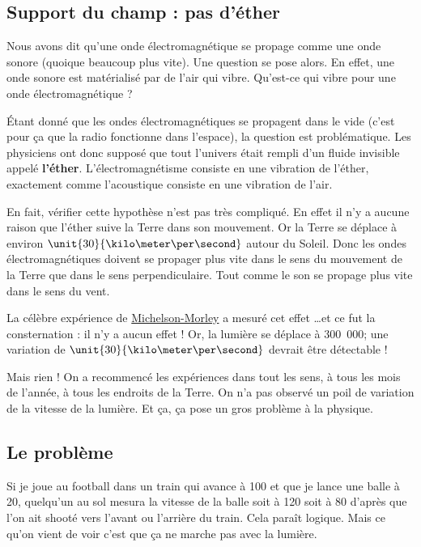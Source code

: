 \documentclass[a4paper,12pt]{book}
\theoremstyle{mes_exemples}	\newtheorem{exemple}[numtho]{Exemple}
\theoremstyle{mes_tho}
\newcommand{\defe}[2]{\textbf{#1}\index{#2}}
\begin{document}
\subsection{Support du champ : pas d'éther}

Nous avons dit qu'une onde électromagnétique se propage comme une onde sonore (quoique beaucoup plus vite). Une question se pose alors. En effet, une onde sonore est matérialisé par de l'air qui vibre. Qu'est-ce qui vibre pour une onde électromagnétique ?

Étant donné que les ondes électromagnétiques se propagent dans le vide (c'est pour ça que la radio fonctionne dans l'espace), la question est problématique. Les physiciens ont donc supposé que tout l'univers était rempli d'un fluide invisible appelé \defe{l'éther}{Éther}. L'électromagnétisme consiste en une vibration de l'éther, exactement comme l'acoustique consiste en une vibration de l'air.

En fait, vérifier cette hypothèse n'est pas très compliqué. En effet il n'y a aucune raison que l'éther suive la Terre dans son mouvement. Or la Terre se déplace à environ $\unit{30}{\kilo\meter\per\second}$ autour du Soleil. Donc les ondes électromagnétiques doivent se propager plus vite dans le sens du mouvement de la Terre que dans le sens perpendiculaire. Tout comme le son se propage plus vite dans le sens du vent.

La célèbre expérience de \href{http://fr.wikipedia.org/wiki/Expérience\_d'interférométrie\_de\_Michelson\_et\_Morley}{Michelson-Morley} a mesuré cet effet \ldots et ce fut la consternation : il n'y a aucun effet ! Or, la lumière se déplace à \unit{300.000}{\kilo\meter\per\second}; une variation de $\unit{30}{\kilo\meter\per\second}$ devrait être détectable !

Mais rien ! On a recommencé les expériences dans tout les sens, à tous les mois de l'année, à tous les endroits de la Terre. On n'a pas observé un poil de variation de la vitesse de la lumière. Et ça, ça pose un gros problème à la physique.


\subsection{Le problème}

Si je joue au football dans un train qui avance à \unit{100}{\kilo\meter\per\hour} et que je lance une balle à \unit{20}{\kilo\meter\per\hour}, quelqu'un au sol mesura la vitesse de la balle soit à \unit{120}{\kilo\meter\per\hour} soit à \unit{80}{\kilo\meter\per\hour} d'après que l'on ait shooté vers l'avant ou l'arrière du train. Cela paraît logique. Mais ce qu'on vient de voir c'est que ça ne marche pas avec la lumière.
\end{document}
